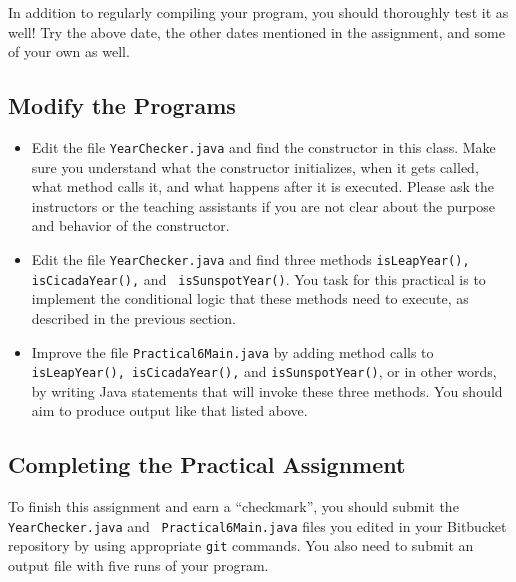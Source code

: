 \noindent In addition to regularly compiling your program, you should thoroughly test it as well! Try the above
date, the other dates mentioned in the assignment, and some of your own as well.

\vspace*{-.1in}
\subsection*{Modify the Programs}
\vspace*{-.05in}
\begin{itemize}

\item Edit the file {\tt YearChecker.java} and find the constructor in this class. Make sure you understand what the
  constructor initializes, when it gets called, what method calls it, and what happens after it is executed. Please ask
  the instructors or the teaching assistants if you are not clear about the purpose and behavior of the constructor.

\item  Edit the file {\tt YearChecker.java} and find three methods {\tt isLeapYear(), isCicadaYear(),} and {\tt
  isSunspotYear()}.  You task for this practical is to implement the conditional logic that these methods need to
  execute, as described in the previous section.

\item \begin{sloppypar} Improve the file {\tt Practical6Main.java} by adding method calls to {\tt isLeapYear(),
  isCicadaYear(),} and {\tt isSunspotYear()}, or in other words, by writing Java statements that will invoke these three
methods. You should aim to produce output like that listed above. \end{sloppypar}

\end{itemize}

\vspace*{-.25in}
\subsection*{Completing the Practical Assignment}
\vspace*{-.1in}

To finish this assignment and earn a ``checkmark'', you should submit the {\tt YearChecker.java} and {\tt
Practical6Main.java} files you edited in your Bitbucket repository by using appropriate {\tt git} commands. You
also need to submit an output file with five runs of your program.

